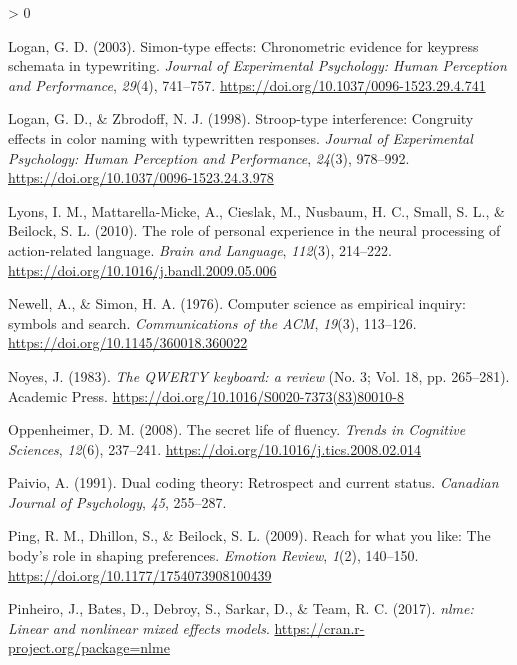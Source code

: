 \documentclass[
  english,
  man]{apa7}
\newlength{\cslhangindent}
\newenvironment{CSLReferences}[2] %
 {%
  \setlength{\parindent}{0pt}
  \ifodd #1 \everypar{\setlength{\hangindent}{\cslhangindent}}\ignorespaces\fi
  \ifnum #2 > 0
  \setlength{\parskip}{#2\baselineskip}
  \fi
 }%
 {}
\begin{document}
\begin{CSLReferences}{1}{0}
\leavevmode\hypertarget{ref-Logan2003}{}%
Logan, G. D. (2003). {Simon-type effects: Chronometric evidence for keypress schemata in typewriting}. \emph{Journal of Experimental Psychology: Human Perception and Performance}, \emph{29}(4), 741--757. \url{https://doi.org/10.1037/0096-1523.29.4.741}

\leavevmode\hypertarget{ref-Logan1998}{}%
Logan, G. D., \& Zbrodoff, N. J. (1998). {Stroop-type interference: Congruity effects in color naming with typewritten responses.} \emph{Journal of Experimental Psychology: Human Perception and Performance}, \emph{24}(3), 978--992. \url{https://doi.org/10.1037/0096-1523.24.3.978}

\leavevmode\hypertarget{ref-Lyons2010}{}%
Lyons, I. M., Mattarella-Micke, A., Cieslak, M., Nusbaum, H. C., Small, S. L., \& Beilock, S. L. (2010). {The role of personal experience in the neural processing of action-related language}. \emph{Brain and Language}, \emph{112}(3), 214--222. \url{https://doi.org/10.1016/j.bandl.2009.05.006}

\leavevmode\hypertarget{ref-Newell1976}{}%
Newell, A., \& Simon, H. A. (1976). {Computer science as empirical inquiry: symbols and search}. \emph{Communications of the ACM}, \emph{19}(3), 113--126. \url{https://doi.org/10.1145/360018.360022}

\leavevmode\hypertarget{ref-Noyes1983}{}%
Noyes, J. (1983). \emph{{The QWERTY keyboard: a review}} (No. 3; Vol. 18, pp. 265--281). Academic Press. \url{https://doi.org/10.1016/S0020-7373(83)80010-8}

\leavevmode\hypertarget{ref-Oppenheimer2008}{}%
Oppenheimer, D. M. (2008). {The secret life of fluency}. \emph{Trends in Cognitive Sciences}, \emph{12}(6), 237--241. \url{https://doi.org/10.1016/j.tics.2008.02.014}

\leavevmode\hypertarget{ref-Paivio1991}{}%
Paivio, A. (1991). {Dual coding theory: Retrospect and current status}. \emph{Canadian Journal of Psychology}, \emph{45}, 255--287.

\leavevmode\hypertarget{ref-Ping2009}{}%
Ping, R. M., Dhillon, S., \& Beilock, S. L. (2009). {Reach for what you like: The body's role in shaping preferences}. \emph{Emotion Review}, \emph{1}(2), 140--150. \url{https://doi.org/10.1177/1754073908100439}

\leavevmode\hypertarget{ref-Pinheiro2017}{}%
Pinheiro, J., Bates, D., Debroy, S., Sarkar, D., \& Team, R. C. (2017). \emph{{nlme: Linear and nonlinear mixed effects models}}. \url{https://cran.r-project.org/package=nlme}


\end{CSLReferences}
\end{document}
